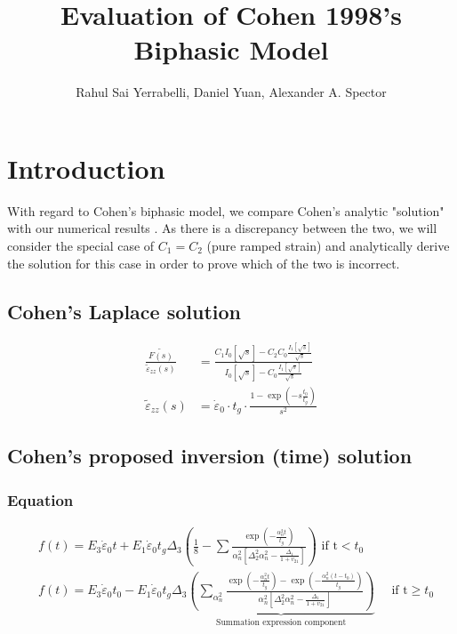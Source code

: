 \documentclass{article}
\title{Evaluation of Cohen 1998's Biphasic Model}
\author{Rahul Sai Yerrabelli, Daniel Yuan, Alexander A. Spector}
\begin{document}
\maketitle

\tableofcontents
\listoffigures



\section{Introduction}

With regard to Cohen's biphasic model, we compare Cohen's analytic "solution" with our numerical results \cite{cohen1998}. As there is a discrepancy between the two, we will consider the special case of $C_1=C_2$ (pure ramped strain) and analytically derive the solution for this case in order to prove which of the two is incorrect.

\subsection{Cohen's Laplace solution}
\begin{align}
\frac{\widetilde{F(s)}}{\tilde{\varepsilon}_{zz}(s)}
&=\frac{C_{1} I_{0}\left[\sqrt{s}\right]-C_{2} C_{0} \frac{I_{1}\left[\sqrt{s}\right]}{\sqrt{s}}}{I_{0}\left[\sqrt{s}\right]-C_{0} \frac{I_{1}\left[\sqrt{s}\right]}{\sqrt{s}}}  \\
\tilde{\varepsilon}_{zz}(s)
&=\dot{\varepsilon}_{0} \cdot t_{g} \cdot \frac{1-\exp \left(-s \frac{t_{0}}{t_{g}}\right)}{s^{2}}
\end{align}

\subsection{Cohen's proposed inversion (time) solution}
\subsubsection{Equation}
\begin{align}
&f(t)=E_{3} \dot{\varepsilon}_{0} t+E_{1} \dot{\varepsilon}_{0} t_{g} \Delta_{3}\left(\frac{1}{8}-\sum{\frac{\exp \left(-\frac{\alpha_{n}^{2} t}{t_{g}}\right)}{\alpha_{n}^{2}\left[\Delta_{2}^{2} \alpha_{n}^{2}-\frac{\Delta_{1}}{1+v_{21}}\right]}}\right) \text { if } \mathrm{t}<t_{0} \\
&f(t)=E_{3} \dot{\varepsilon}_{0} t_{0}-E_{1} \dot{\varepsilon}_{0} t_{g} \Delta_{3}\underbrace{\left(\sum_{\alpha_{n}^{2}}{\frac{\exp \left(-\frac{\alpha_{n}^{2} t}{t_{g}}\right)-\exp \left(-\frac{\alpha_{n}^{2}\left(t-t_{0}\right)}{t_{g}}\right)}{\alpha_{n}^{2}\left[\Delta_{2}^{2} \alpha_{n}^{2}-\frac{\Delta_{1}}{1+v_{21}}\right]}}\right)}_{\text{Summation expression component}} \quad \text { if } \mathrm{t} \geq t_{0}
\end{align}
\end{document}
